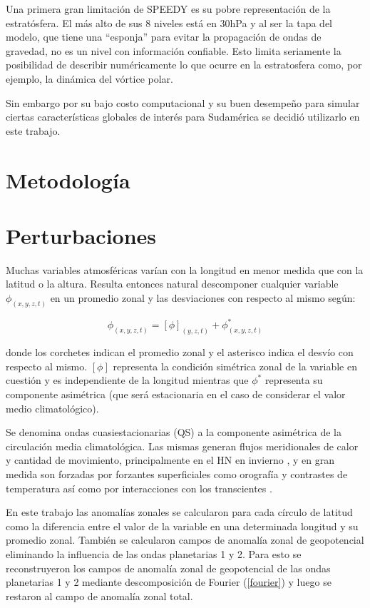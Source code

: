 \documentclass[spanish,a4paper,12pt,oneside]{book}
\begin{document}
Una primera gran limitación de SPEEDY es su pobre representación de la
estratósfera. El más alto de sus 8 niveles está en 30hPa y al ser la
tapa del modelo, que tiene una ``esponja'' para evitar la propagación de
ondas de gravedad, no es un nivel con información confiable. Esto limita
seriamente la posibilidad de describir numéricamente lo que ocurre en la
estratosfera como, por ejemplo, la dinámica del vórtice polar.

Sin embargo por su bajo costo computacional y su buen desempeño para
simular ciertas características globales de interés para Sudamérica
\citep{Barreiro2014} se decidió utilizarlo en este trabajo.

\hypertarget{metodologia}{%
\section{Metodología}\label{metodologia}}

\section*{Perturbaciones}

Muchas variables atmosféricas varían con la longitud en menor medida que
con la latitud o la altura. Resulta entonces natural descomponer
cualquier variable \(\phi_{(x, y, z, t)}\) en un promedio zonal y las
desviaciones con respecto al mismo según:

\[
\phi_{(x, y, z, t)} = [\phi]_{(y, z, t)} + \phi_{(x, y, z, t)}^*
\]

donde los corchetes indican el promedio zonal y el asterisco indica el
desvío con respecto al mismo. \([\phi]\) representa la condición
simétrica zonal de la variable en cuestión y es independiente de la
longitud mientras que \(\phi^*\) representa su componente asimétrica
(que será estacionaria en el caso de considerar el valor medio
climatológico).

Se denomina ondas cuasiestacionarias (QS) a la componente asimétrica de
la circulación media climatológica. Las mismas generan flujos
meridionales de calor y cantidad de movimiento, principalmente en el HN
en invierno \citep{James}, y en gran medida son forzadas por forzantes
superficiales como orografía y contrastes de temperatura así como por
interacciones con los transcientes \citep{Rao2004}.

En este trabajo las anomalías zonales se calcularon para cada círculo de
latitud como la diferencia entre el valor de la variable en una
determinada longitud y su promedio zonal. También se calcularon campos
de anomalía zonal de geopotencial eliminando la influencia de las ondas
planetarias 1 y 2. Para esto se reconstruyeron los campos de anomalía
zonal de geopotencial de las ondas planetarias 1 y 2 mediante
descomposición de Fourier (\autoref{fourier}) y luego se restaron al
campo de anomalía zonal total.
\end{document}

